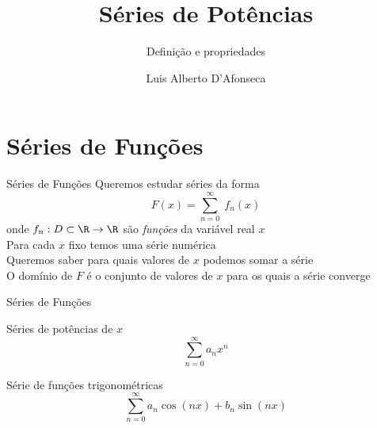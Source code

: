 
\usepackage{apresentacao}
\usepackage{tabto}

\graphicspath{{./figs/}}

\newcommand{\mytitle}   {Séries de Potências}
\newcommand{\mysubtitle}{Definição e propriedades}
\title   {\mytitle}
\subtitle{\mysubtitle}
\author  {\large Luis Alberto D'Afonseca}
\date    {}



\begin{frame}
    \titlepage
\end{frame}

\section{Séries de Funções}

\begin{frame}{Séries de Funções}
  Queremos estudar séries da forma
  \[
    F(x) = \sum_{n=0}^\infty\; f_n(x)
  \]
  \pause
  onde $f_n:D \subset \R\to\R$ são \emph{funções} da variável real $x$ \\[5mm]

  \pause
  Para cada $x$ fixo temos uma série numérica \\[5mm]

  \pause
  Queremos saber para quais valores de $x$ podemos somar a série \\[5mm]

  \pause
  O domínio de $F$ é o conjunto de valores de $x$ para os quais a série converge
\end{frame}

\begin{frame}{Séries de Funções}
  \begin{description}[<+->]
    \item[Séries de Potências] Séries de potências de $x$
    \[
      \sum_{n=0}^\infty a_n x^n
    \]

    \item[Séries de Fourier] Série de funções trigonométricas
    \[
      \sum_{n=0}^\infty a_n \cos(nx) + b_n \sin(nx)
    \]
  \end{description}
\end{frame}

